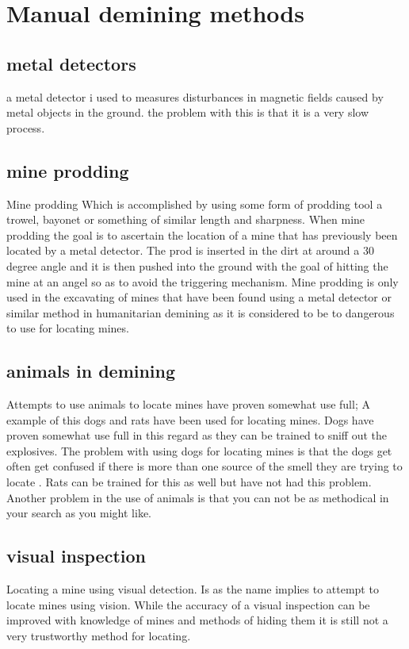 \section{Manual demining methods}

\subsection{metal detectors}

a metal detector i used to measures disturbances in magnetic fields caused by metal objects in the ground. the problem with this is that it is a very slow process.

\subsection{mine prodding}
Mine prodding Which is accomplished by using some form of prodding tool a trowel, bayonet or something of similar length and sharpness. When mine prodding the goal is to ascertain the location of a mine that has previously been located by a metal detector. The prod is inserted in the dirt at around a 30 degree angle and it is then pushed into the ground with the goal of hitting the mine at an angel so as to avoid the triggering mechanism. Mine prodding is only used in the excavating of mines that have been found using a metal detector or similar method in humanitarian demining as it is considered to be to dangerous to use for locating mines.

\subsection{animals in demining}
Attempts to use animals to locate mines have proven somewhat use full; A example of this dogs and rats have been used for locating mines. Dogs have proven somewhat use full in this regard as they can be trained to sniff out the explosives. The problem with using dogs for locating mines is that the dogs get often get confused if there is more than one source of the smell they are trying to locate \cite{DeminingDogs2016}. Rats can be trained for this as well but have not had this problem\cite{PouchedRats2016}. Another problem in the use of animals is that you can not be as methodical in your search as you might like.

\subsection{visual inspection}
Locating a mine using visual detection. Is as the name implies to attempt to locate mines using vision. While the accuracy of a visual inspection can be improved with knowledge of mines and methods of hiding them it is still not a very trustworthy method for locating\cite{LandmineDetection2000}.

